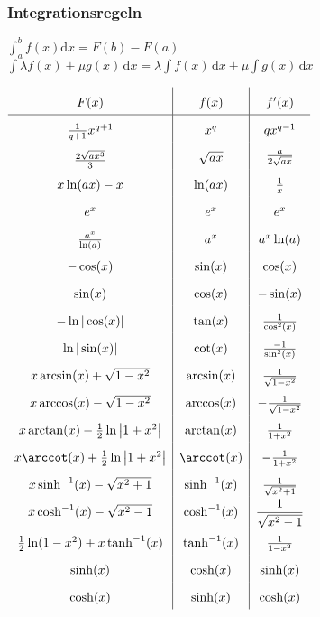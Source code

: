 \documentclass[german]{latex4ei/latex4ei_sheet}
\begin{document}
\begin{sectionbox}
    \subsubsection{Integrationsregeln}
    $\int_a^b f(x) \mathrm dx = F(b) - F(a)$\\
    $\int\lambda f(x)+\mu g(x) \, \mathrm dx=\lambda\int f(x) \, \mathrm dx + \mu\int g(x) \, \mathrm dx$
    
    \everymath{\displaystyle}	%
    \begin{math}\renewcommand{\arraystretch}{1.8}
    \begin{array}{c|c|c}
    F(x) & f(x) & f'(x) \\ \hline
    \frac{1}{q+1}x^{q+1} & x^q & qx^{q-1} \\
    \raisebox{-0.2em}{$\frac{2\sqrt{ax^3}}{3}$} & \sqrt{ax} & \raisebox{0.2em}{$\frac{a}{2\sqrt{ax}}$}\\
    x\ln(ax) -x & \ln(ax) & \textstyle \frac{1}{x}\\
    e^x & e^x & e^x \\
    \frac{a^x}{\ln(a)} & a^x & a^x \ln(a) \\
    -\cos(x) & \sin(x) & \cos(x)\\
    \sin(x) & \cos(x) & -\sin(x)\\
    -\ln |\cos(x)| & \tan(x) & \frac{1}{\cos^2(x)} \\
    \ln |\sin(x)| & \cot(x) & \frac{-1}{\sin^2(x)} \\
    x\arcsin (x)+\sqrt{1-x^2} & \arcsin(x) & \frac{1}{\sqrt{1-x^2}}\\
    x\arccos (x)-\sqrt{1-x^2} & \arccos(x) & -\frac{1}{\sqrt{1-x^2}}\\
    x\arctan (x)-\frac{1}{2} \ln \left| 1+ x^2 \right| & \arctan (x) & \frac{1}{1+x^2} \\
    x\arccot (x)+\frac{1}{2} \ln \left| 1+ x^2 \right| & \arccot (x) & -\frac{1}{1+x^2} \\
    x \sinh ^{-1} (x) - \sqrt{x^2+1} & \sinh ^{-1} (x) & \frac{1}{\sqrt{x^2+1}}\\
    x \cosh ^{-1} (x) - \sqrt{x^2-1}  & \cosh ^{-1} (x) & \dfrac{1}{\sqrt{x^2-1}}\\
    \frac{1}{2}\ln(1-x^2) + x \tanh ^{-1} (x) & \tanh ^{-1} (x) & \frac{1}{1-x^2}\\
    \sinh(x) & \cosh(x) & \sinh (x) \\
    \cosh(x) & \sinh(x) & \cosh (x)\\
    \end{array}
    \end{math}
    \everymath{\textstyle}
    

\end{sectionbox}
\end{document}

